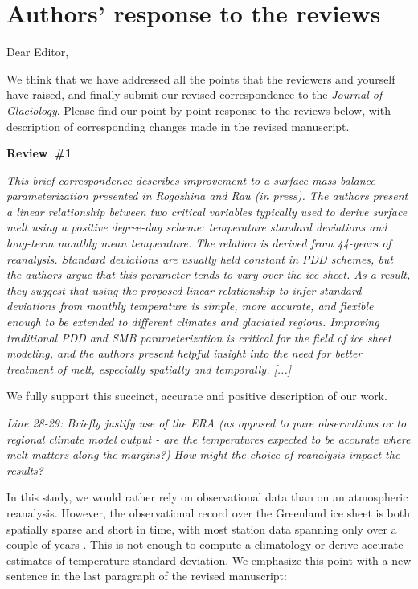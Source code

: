 \documentclass[10pt]{article}
\def\referee#1{\bigskip\textcolor{blue!50!black}{\textit{#1}}}
\begin{document}
\section*{Authors' response to the reviews}

Dear Editor,

We think that we have addressed all the points that the reviewers and yourself have raised, and finally submit our revised correspondence to the \emph{Journal of Glaciology}. Please find our point-by-point response to the reviews below, with description of corresponding changes made in the revised manuscript.


\bigskip
\textbf{Review~{\#}1}

\referee{This brief correspondence describes improvement to a surface mass balance parameterization presented in Rogozhina and Rau (in  press). The authors present a linear relationship between two critical variables typically used to derive surface melt using a positive degree-day scheme: temperature standard deviations and long-term monthly mean temperature. The relation is derived from 44-years of reanalysis. Standard deviations are usually held constant in PDD schemes, but the authors argue that this parameter tends to vary over the ice sheet. As a result, they suggest that using the proposed linear relationship to infer standard deviations from monthly temperature is simple, more accurate, and flexible enough to be extended to different climates and glaciated regions. Improving traditional PDD and SMB parameterization is critical for the field of ice sheet modeling, and the authors present helpful insight into the need for better treatment of melt, especially spatially and temporally. [...]}

We fully support this succinct, accurate and positive description of our work.



\referee{Line 28-29: Briefly justify use of the ERA (as opposed to pure observations or to regional climate model output - are the temperatures expected to be accurate where melt matters along the margins?) How might the choice of reanalysis impact the results?}

In this study, we would rather rely on observational data than on an atmospheric reanalysis. However, the observational record over the Greenland ice sheet is both spatially sparse and short in time, with most station data spanning only over a couple of years \citep[see e.g.~][]{fausto-etal-2009}. This is not enough to compute a climatology or derive accurate estimates of temperature standard deviation. We emphasize this point with a new sentence in the last paragraph of the revised manuscript:
\end{document}
